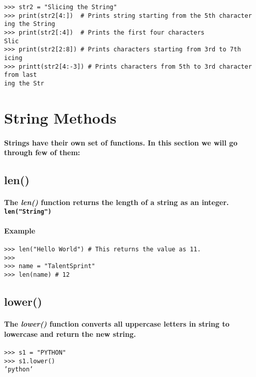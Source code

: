 \documentclass{book}
\begin{document}
\begin{verbatim}
>>> str2 = "Slicing the String"
>>> print(str2[4:])  # Prints string starting from the 5th character 
ing the String
>>> print(str2[:4])  # Prints the first four characters
Slic
>>> print(str2[2:8]) # Prints characters starting from 3rd to 7th
icing
>>> printt(str2[4:-3]) # Prints characters from 5th to 3rd character from last
ing the Str
\end{verbatim}

\section*{String Methods}

\paragraph{Strings have their own set of functions. In this section we will go through few of them:}

\subsection*{len()}

\paragraph{The \textit{len()} function returns the length of a string as an integer. \texttt{len("String")}}

\paragraph{Example}

\begin{verbatim}
>>> len("Hello World") # This returns the value as 11.
>>>
>>> name = "TalentSprint"
>>> len(name) # 12
\end{verbatim}

\subsection*{lower()}

\paragraph{The \textit{lower()} function converts all uppercase letters in string to lowercase and return the new string.}

\begin{verbatim}
>>> s1 = "PYTHON"
>>> s1.lower()
’python’
\end{verbatim}
\end{document}
